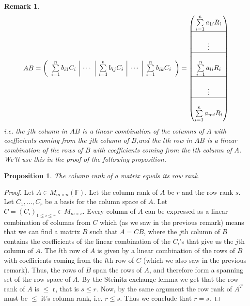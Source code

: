 \documentclass[12pt]{article}
\newcommand{\field}{\mathbb{F}}
\newtheorem*{remark}{Remark}
\newtheorem{prop}{Proposition}[thm]
\begin{document}
\begin{remark}
\begin{equation*}
  AB =
    \begingroup
    \left(
    \begin{array}{c|c|c|c|c}
      \sum\limits_{i=1}^nb_{i1}C_i & \cdots &  \sum\limits_{i=1}^nb_{ij}C_i & \cdots & \sum\limits_{i=1}^nb_{ik}C_i
    \end{array}
    \right)
    \endgroup
    =
    \begin{pmatrix}
      \sum\limits_{i=1}^na_{1i} R_i 
      \\
      \hline
      \\
      \vdots
      \\
      \hline
      \\
      \sum\limits_{i=1}^na_{li} R_i
      \\
      \hline
      \\
      \vdots
      \\
      \hline
      \\
      \sum\limits_{i=1}^na_{mi}R_i
      \\
    \end{pmatrix}
\end{equation*}
i.e. the $j$th column in $AB$ is a linear combination of the columns of $A$ with coefficients coming from the $j$th column of $B$,and the $l$th row in $AB$ is a linear combination of the rows of $B$ with coefficients coming from the $l$th column of $A$. We'll use this in the proof of the following proposition.
\end{remark}

\begin{prop}
  The column rank of a matrix equals its row rank.
\end{prop}
\begin{proof}
  Let $A \in M_{m \times n}(\field)$.  Let the column rank of $A$ be $r$ and the row rank $s$. Let $C_1, \dots, C_r$ be a basis for
  the column space of $A$. Let $C=(C_i)_{1\leq i \leq r} \in M_{m \times r}$. Every column of $A$ can be expressed as a linear combination of columns from $C$ which (as we saw in the previous remark) means that we can find a matrix $B$ such that $A=CB$, where the $j$th column of $B$
  contains the coefficients of the linear combination of the $C_i$'s that give us the $j$th column of
  $A$. The $l$th row of $A$ is given by a linear combination of the rows of $B$ with coefficients coming from the $l$th  row of $C$ (which we also saw in the previous remark). Thus, the rows of $B$ span the rows of $A$,
  and therefore form a spanning set of the row space of $A$. By the Steinitz exchange lemma we get that the row rank of $A$ is $\leq$ r, that is $s \leq r$.
  Now, by the same argument the row rank of $A^T$ must be $\leq$ it's column rank, i.e. $r \leq s$. Thus we conclude that $r=s$.
\end{proof}
\end{document}
